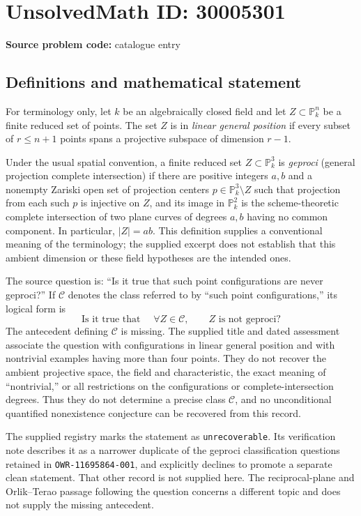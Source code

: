 \documentclass[11pt]{article}
\newcommand{\PP}{\mathbb{P}}
\begin{document}
\section*{UnsolvedMath ID: 30005301}
\textbf{Source problem code:} catalogue entry
\subsection{Definitions and mathematical statement}
For terminology only, let \(k\) be an algebraically closed field and let \(Z\subset\PP^n_k\) be a finite reduced set of points. The set \(Z\) is in \emph{linear general position} if every subset of \(r\leq n+1\) points spans a projective subspace of dimension \(r-1\).

Under the usual spatial convention, a finite reduced set \(Z\subset\PP^3_k\) is \emph{geproci} (general projection complete intersection) if there are positive integers \(a,b\) and a nonempty Zariski open set of projection centers \(p\in\PP^3_k\setminus Z\) such that projection from each such \(p\) is injective on \(Z\), and its image in \(\PP^2_k\) is the scheme-theoretic complete intersection of two plane curves of degrees \(a,b\) having no common component. In particular, \(|Z|=ab\). This definition supplies a conventional meaning of the terminology; the supplied excerpt does not establish that this ambient dimension or these field hypotheses are the intended ones.

The source question is: ``Is it true that such point configurations are never geproci?'' If \(\mathcal C\) denotes the class referred to by ``such point configurations,'' its logical form is
\[
\text{Is it true that }\quad
\forall Z\in\mathcal C,\qquad Z\text{ is not geproci}?
\]
The antecedent defining \(\mathcal C\) is missing. The supplied title and dated assessment associate the question with configurations in linear general position and with nontrivial examples having more than four points. They do not recover the ambient projective space, the field and characteristic, the exact meaning of ``nontrivial,'' or all restrictions on the configurations or complete-intersection degrees. Thus they do not determine a precise class \(\mathcal C\), and no unconditional quantified nonexistence conjecture can be recovered from this record.

The supplied registry marks the statement as \texttt{unrecoverable}. Its verification note describes it as a narrower duplicate of the geproci classification questions retained in \texttt{OWR-11695864-001}, and explicitly declines to promote a separate clean statement. That other record is not supplied here. The reciprocal-plane and Orlik--Terao passage following the question concerns a different topic and does not supply the missing antecedent.
\end{document}
